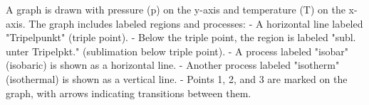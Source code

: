 A graph is drawn with pressure (p) on the y-axis and temperature (T) on the x-axis. The graph includes labeled regions and processes:  
- A horizontal line labeled "Tripelpunkt" (triple point).  
- Below the triple point, the region is labeled "subl. unter Tripelpkt." (sublimation below triple point).  
- A process labeled "isobar" (isobaric) is shown as a horizontal line.  
- Another process labeled "isotherm" (isothermal) is shown as a vertical line.  
- Points 1, 2, and 3 are marked on the graph, with arrows indicating transitions between them.